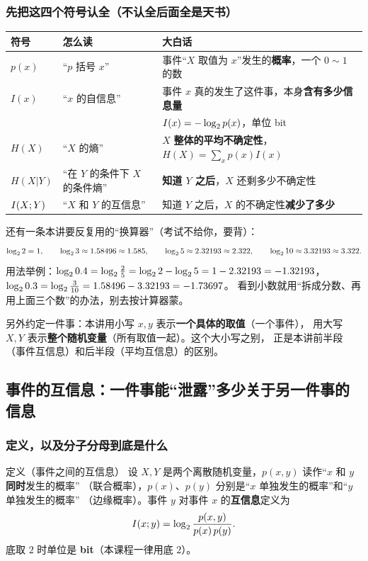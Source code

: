 \subsubsection{先把这四个符号认全（不认全后面全是天书）}

\begin{center}
\small
\begin{tabular}{@{}lll@{}}
\toprule
符号 & 怎么读 & 大白话 \\
\midrule
$p(x)$ & “$p$ 括号 $x$” & 事件“$X$ 取值为 $x$”发生的\textbf{概率}，一个 $0\sim1$ 的数 \\
$I(x)$ & “$x$ 的自信息” & 事件 $x$ 真的发生了这件事，本身\textbf{含有多少信息量} \\
 & & $I(x)=-\log_{2} p(x)$，单位 bit \\
$H(X)$ & “$X$ 的熵” & $X$ \textbf{整体的平均不确定性}，$H(X)=\sum_x p(x)I(x)$ \\
$H(X|Y)$ & “在 $Y$ 的条件下 $X$ 的条件熵” & \textbf{知道 $Y$ 之后}，$X$ 还剩多少不确定性 \\
$I\!\left(X;Y\right)$ & “$X$ 和 $Y$ 的互信息” & 知道 $Y$ 之后，$X$ 的不确定性\textbf{减少了多少} \\
\bottomrule
\end{tabular}
\end{center}

还有一条本讲要反复用的“换算器”（考试不给你，要背）：
\[
\log_{2} 2=1,\qquad \log_{2} 3\approx1.58496\approx1.585,\qquad
\log_{2} 5\approx2.32193\approx2.322,\qquad \log_{2} 10\approx3.32193\approx3.322 .
\]
用法举例：$\log_{2} 0.4=\log_{2}\frac{2}{5}=\log_{2} 2-\log_{2} 5=1-2.32193=-1.32193$，
$\log_{2} 0.3=\log_{2}\frac{3}{10}=1.58496-3.32193=-1.73697$。
看到小数就用“拆成分数、再用上面三个数”的办法，别去按计算器蒙。

另外约定一件事：本讲用小写 $x,y$ 表示\textbf{一个具体的取值}（一个事件），
用大写 $X,Y$ 表示\textbf{整个随机变量}（所有取值一起）。这个大小写之别，
正是本讲前半段（事件互信息）和后半段（平均互信息）的区别。

\subsection{事件的互信息：一件事能“泄露”多少关于另一件事的信息}

\subsubsection{定义，以及分子分母到底是什么}

\begin{defbox}{定义（事件之间的互信息）}
设 $X,Y$ 是两个离散随机变量，$p(x,y)$ 读作“$x$ 和 $y$ \textbf{同时}发生的概率”
（联合概率），$p(x)$、$p(y)$ 分别是“$x$ 单独发生的概率”和“$y$ 单独发生的概率”
（边缘概率）。事件 $y$ 对事件 $x$ 的\textbf{互信息}定义为
\[
I\!\left(x;y\right)=\log_{2}\frac{p(x,y)}{p(x)\,p(y)} .
\]
底取 $2$ 时单位是 \textbf{bit}（本课程一律用底 $2$）。
\end{defbox}

